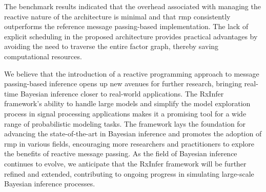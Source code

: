 The benchmark results indicated that the overhead associated with managing the reactive nature of
the architecture is minimal and that \ac{rmp} consistently outperforms the reference message
passing-based implementation.
The lack of explicit scheduling in the proposed architecture provides practical advantages by
avoiding the need to traverse the entire factor graph, thereby saving computational resources.

We believe that the introduction of a reactive programming approach to message passing-based
inference opens up new avenues for further research, bringing real-time Bayesian inference
closer to real-world applications.
The RxInfer framework's ability to handle large models and simplify the model exploration
process in signal processing applications makes it a promising tool for a wide range of
probabilistic modeling tasks.
The framework lays the foundation for advancing the state-of-the-art in Bayesian inference and
promotes the adoption of \ac{rmp} in various fields, encouraging more researchers and practitioners
to explore the benefits of reactive message passing.
As the field of Bayesian inference continues to evolve, we anticipate that the RxInfer framework
will be further refined and extended, contributing to ongoing progress in simulating large-scale Bayesian inference processes.

